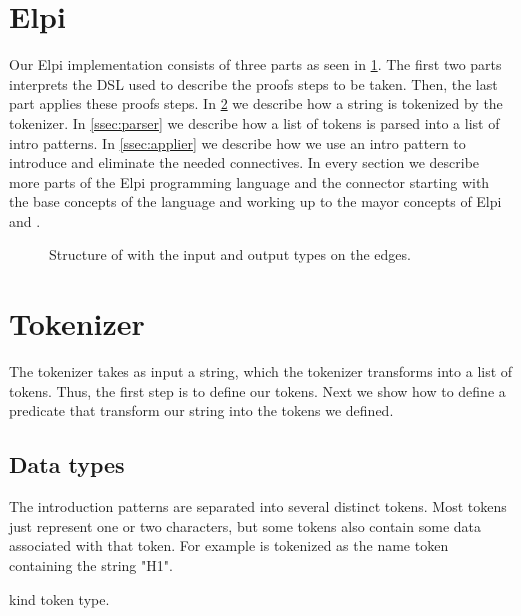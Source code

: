 \documentclass[thesis.tex]{subfiles}
\begin{document}
{\section{Elpi}\label{sec:elpi}
Our Elpi implementation  consists of three parts as seen in \cref{fig:eiintrosstruct}. The first two parts interprets the DSL used to describe the proofs steps to be taken. Then, the last part applies these proofs steps. In \cref{ssec:tokenizer} we describe how a string is tokenized by the tokenizer. In \cref{ssec:parser} we describe how a list of tokens is parsed into a list of intro patterns. In \cref{ssec:applier} we describe how we use an intro pattern to introduce and eliminate the needed connectives. In every section we describe more parts of the Elpi programming language and the \ce connector starting with the base concepts of the language and working up to the mayor concepts of Elpi and \ce.
\begin{figure}
  \centering
  \caption{Structure of  with the input and output types on the edges.}
  \label{fig:eiintrosstruct}
\end{figure}

\section{Tokenizer}\label{ssec:tokenizer}
The tokenizer takes as input a string, which the tokenizer transforms into a list of tokens. Thus, the first step is to define our tokens. Next we show how to define a predicate that transform our string into the tokens we defined.

\subsection{Data types}\label{sssec:datatypes}
The introduction patterns are separated into several distinct tokens. Most tokens just represent one or two characters, but some tokens also contain some data associated with that token. For example  is tokenized as the name token containing the string "H1".
\begin{elpicode}
  kind token type.


\end{elpicode}}
\end{document}
